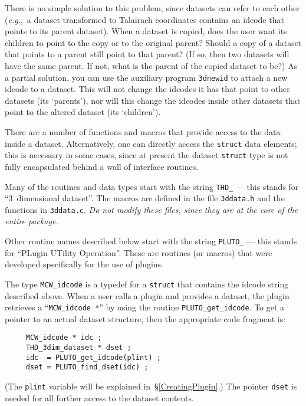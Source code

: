     There is no simple solution to this problem, since datasets can
    refer to each other ({\it e.g.},~a dataset transformed to Talairach
    coordinates contains an idcode that points to its parent dataset).
    When a dataset is copied, does the user want its children to
    point to the copy or to the original parent?  Should a copy
    of a dataset that points to a parent still point to that parent?
    (If so, then two datasets will have the same parent.  If not,
    what is the parent of the copied dataset to be?)
    As a partial solution, you can use
    the auxiliary program {\tt 3dnewid} to attach a new
    idcode to a dataset.  This will not change the idcodes it has
    that point to other datasets (its `parents'), nor will this
    change the idcodes inside other datasets that point to the altered dataset
    (its `children').

\label{Accessing}
There are a number of functions and macros that provide access to
the data inside a dataset.  Alternatively, one can directly
access the {\tt struct} data elements; this is necessary in some cases,
since at present the dataset {\tt struct} type is not fully encapsulated
behind a wall of interface routines.

Many of the routines and data types start with the string
{\tt THD\_} --- this stands for ``3~dimensional dataset''.
The macros are defined in the file {\tt 3ddata.h} and the
functions in {\tt 3ddata.c}.  {\it Do not modify these
files, since they are at the core of the entire \mcwafni package.}

Other routine names described below start with the string
{\tt PLUTO\_} --- this stands for ``PLugin UTility Operation''.
These are routines (or macros) that were developed specifically
for the use of plugins.

  The type {\tt MCW\_idcode} is a typedef for a {\tt struct} that contains
  the idcode string described above.  When a user calls a plugin
  and provides a dataset, the plugin retrieves a ``{\tt MCW\_idcode~*}''
  by using the routine {\tt PLUTO\_get\_idcode}.
  To get a pointer to an actual dataset structure, then
  the appropriate code fragment is:

\begin{samepage}\begin{verbatim}
     MCW_idcode * idc ;
     THD_3dim_dataset * dset ;
     idc  = PLUTO_get_idcode(plint) ;
     dset = PLUTO_find_dset(idc) ;
\end{verbatim}\end{samepage}
  (The {\tt plint} variable will be explained in~\S\ref{CreatingPlugin}.)
   The pointer {\tt dset} is
   needed for all further access to the dataset contents.

